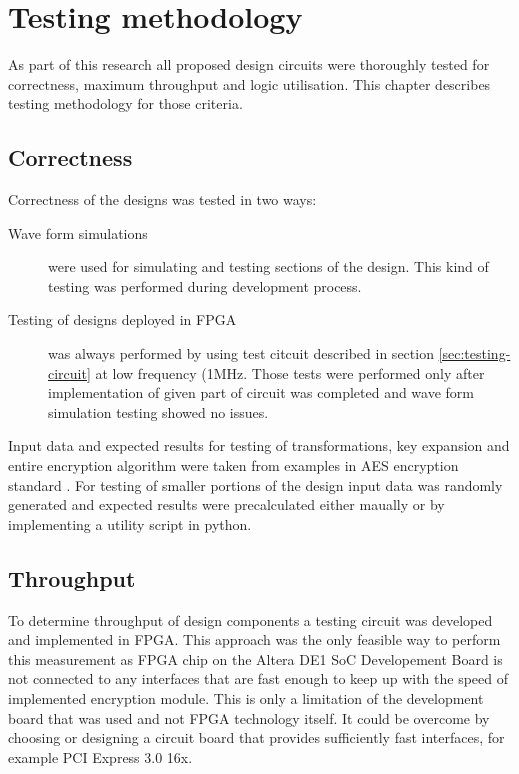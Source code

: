 \section{Testing methodology}
\label{sec:testing-methodology}
As part of this research all proposed design circuits were thoroughly tested for correctness, maximum throughput and logic utilisation. This chapter describes testing methodology for those criteria.

\subsection{Correctness}
Correctness of the designs was tested in two ways:
\begin{description}
\item[Wave form simulations] were used for simulating and testing sections of the design. This kind of testing was performed during development process.
\item[Testing of designs deployed in FPGA] was always performed by using test citcuit described in section \ref{sec:testing-circuit} at low frequency (1MHz. Those tests were performed only after implementation of given part of circuit was completed and wave form simulation testing showed no issues.
\end{description}

Input data and expected results for testing of transformations, key expansion and entire encryption algorithm were taken from examples in AES encryption standard \cite{aes-standard}. For testing of smaller portions of the design input data was randomly generated and expected results were precalculated either maually or by implementing a utility script in python.


\subsection{Throughput}
To determine throughput of design components a testing circuit was developed and implemented in FPGA. This approach was the only feasible way to perform this measurement as FPGA chip on the Altera DE1 SoC Developement Board is not connected to any interfaces that are fast enough to keep up with the speed of implemented encryption module. This is only a limitation of the development board that was used and not FPGA technology itself. It could be overcome by choosing or designing a circuit board that provides sufficiently fast interfaces, for example PCI Express 3.0 16x.

